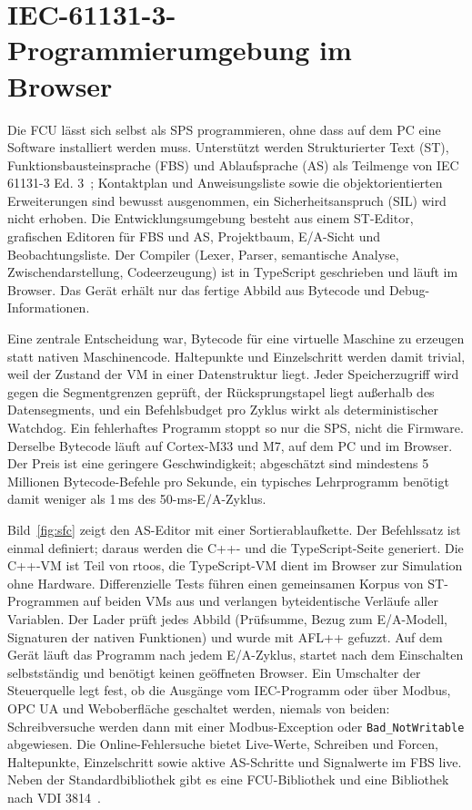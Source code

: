 \documentclass[]{article}
\begin{document}
\section{IEC-61131-3-Programmierumgebung im Browser}\label{sec:plc}

Die FCU lässt sich selbst als SPS programmieren, ohne dass auf dem PC eine Software installiert werden muss. Unterstützt werden Strukturierter Text (ST), Funktionsbausteinsprache (FBS) und Ablaufsprache (AS) als Teilmenge von IEC 61131-3 Ed. 3~\cite{iec61131}; Kontaktplan und Anweisungsliste sowie die objektorientierten Erweiterungen sind bewusst ausgenommen, ein Sicherheitsanspruch (SIL) wird nicht erhoben. Die Entwicklungsumgebung besteht aus einem ST-Editor, grafischen Editoren für FBS und AS, Projektbaum, E/A-Sicht und Beobachtungsliste. Der Compiler (Lexer, Parser, semantische Analyse, Zwischendarstellung, Codeerzeugung) ist in TypeScript geschrieben und läuft im Browser. Das Gerät erhält nur das fertige Abbild aus Bytecode und Debug-Informationen.

Eine zentrale Entscheidung war, Bytecode für eine virtuelle Maschine zu erzeugen statt nativen Maschinencode. Haltepunkte und Einzelschritt werden damit trivial, weil der Zustand der VM in einer Datenstruktur liegt. Jeder Speicherzugriff wird gegen die Segmentgrenzen geprüft, der Rücksprungstapel liegt außerhalb des Datensegments, und ein Befehlsbudget pro Zyklus wirkt als deterministischer Watchdog. Ein fehlerhaftes Programm stoppt so nur die SPS, nicht die Firmware. Derselbe Bytecode läuft auf Cortex-M33 und M7, auf dem PC und im Browser. Der Preis ist eine geringere Geschwindigkeit; abgeschätzt sind mindestens 5 Millionen Bytecode-Befehle pro Sekunde, ein typisches Lehrprogramm benötigt damit weniger als 1\,ms des 50-ms-E/A-Zyklus.

Bild~\ref{fig:sfc} zeigt den AS-Editor mit einer Sortierablaufkette. Der Befehlssatz ist einmal definiert; daraus werden die C++- und die TypeScript-Seite generiert. Die C++-VM ist Teil von rtoos, die TypeScript-VM dient im Browser zur Simulation ohne Hardware. Differenzielle Tests führen einen gemeinsamen Korpus von ST-Programmen auf beiden VMs aus und verlangen byteidentische Verläufe aller Variablen. Der Lader prüft jedes Abbild (Prüfsumme, Bezug zum E/A-Modell, Signaturen der nativen Funktionen) und wurde mit AFL++ gefuzzt. Auf dem Gerät läuft das Programm nach jedem E/A-Zyklus, startet nach dem Einschalten selbstständig und benötigt keinen geöffneten Browser. Ein Umschalter der Steuerquelle legt fest, ob die Ausgänge vom IEC-Programm oder über Modbus, OPC UA und Weboberfläche geschaltet werden, niemals von beiden: Schreibversuche werden dann mit einer Modbus-Exception oder \texttt{Bad\_NotWritable} abgewiesen. Die Online-Fehlersuche bietet Live-Werte, Schreiben und Forcen, Haltepunkte, Einzelschritt sowie aktive AS-Schritte und Signalwerte im FBS live. Neben der Standardbibliothek gibt es eine FCU-Bibliothek und eine Bibliothek nach VDI 3814~\cite{vdi3814}.
\end{document}
